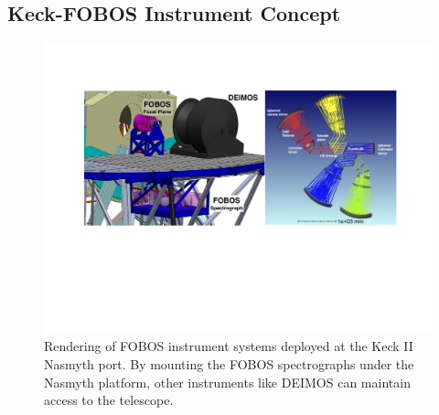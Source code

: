 \documentclass[oneside,11pt]{amsart}
\newcommand{\comment}[2][todo]{{\color{#1}[[{\bf #2}]]}}
\begin{document}
\subsection{Keck-FOBOS Instrument Concept}
\label{sec:concept}




 \begin{figure}[h!]
  \vskip -0.1in
  \includegraphics[width=\textwidth]{figs/FOBOS_inst.pdf} %
  \caption{\small Rendering of FOBOS instrument systems deployed at the Keck II Nasmyth port.  By mounting the FOBOS spectrographs under the Nasmyth platform, other instruments like DEIMOS can maintain access to the telescope.}\label{fig:layout}
 \end{figure}
\end{document}
